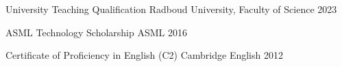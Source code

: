 

\begin{cvhonors}

  \cvhonor
    {University Teaching Qualification} %
    {Radboud University, Faculty of Science} %
    {} %
    {2023} %

  \cvhonor
    {ASML Technology Scholarship} %
    {ASML} %
    {} %
    {2016} %

  \cvhonor
    {Certificate of Proficiency in English (C2)} %
    {Cambridge English} %
    {} %
    {2012} %

\end{cvhonors}

